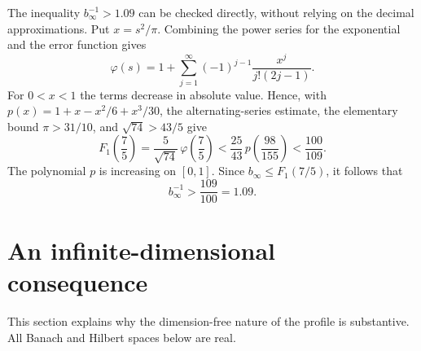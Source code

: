 \documentclass[11pt]{article}
\theoremstyle{definition}
\theoremstyle{remark}
\begin{document}
The inequality $b_\infty^{-1}>1.09$ can be checked directly,
without relying on the  decimal approximations.  Put
$x=s^2/\pi$.  Combining the power series for the exponential and the
error function gives
\[
 \varphi(s)=1+\sum_{j=1}^\infty
 (-1)^{j-1}\frac{x^j}{j!(2j-1)}.
\]
For $0<x<1$ the terms decrease in absolute value.  Hence, with
$p(x)=1+x-x^2/6+x^3/30$, the alternating-series estimate, the
elementary bound $\pi>31/10$, and $\sqrt{74}>43/5$ give
\[
 F_1\!\left(\frac75\right)
=\frac5{\sqrt{74}}\,\varphi\!\left(\frac75\right)
 <\frac{25}{43}\,
 p\!\left(\frac{98}{155}\right)
 <\frac{100}{109}.
\]
The polynomial  $p$ is increasing on $[0,1]$.  Since
$b_\infty\leq F_1(7/5)$, it follows that
\[
 b_\infty^{-1}>\frac{109}{100}=1.09.
\]

\section{An infinite-dimensional consequence}
\label{sec:infinite-dimensional}

This section explains why the dimension-free nature of the profile is
substantive.  All Banach and Hilbert spaces below are real.
\end{document}
